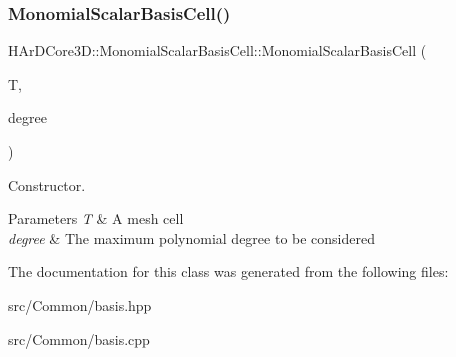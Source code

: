 \subsubsection{\texorpdfstring{Monomial\+Scalar\+Basis\+Cell()}{MonomialScalarBasisCell()}}
{\footnotesize\ttfamily H\+Ar\+D\+Core3\+D\+::\+Monomial\+Scalar\+Basis\+Cell\+::\+Monomial\+Scalar\+Basis\+Cell (\begin{DoxyParamCaption}\item[{const \hyperlink{classHArDCore3D_1_1Cell}{Cell} \&}]{T,  }\item[{size\+\_\+t}]{degree }\end{DoxyParamCaption})}



Constructor. 


\begin{DoxyParams}{Parameters}
{\em T} & A mesh cell \\
\hline
{\em degree} & The maximum polynomial degree to be considered \\
\hline
\end{DoxyParams}


The documentation for this class was generated from the following files\+:\begin{DoxyCompactItemize}
\item 
src/\+Common/basis.\+hpp\item 
src/\+Common/basis.\+cpp\end{DoxyCompactItemize}
